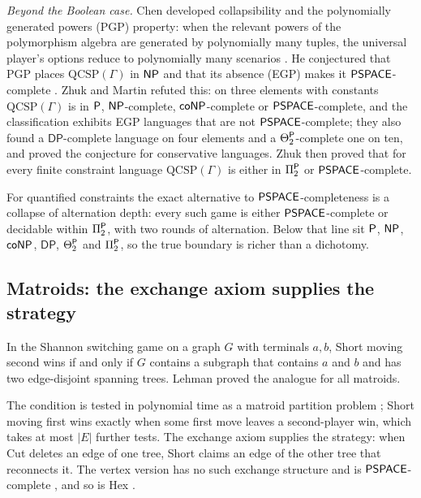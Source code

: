 \noindent\emph{Beyond the Boolean case.} Chen developed collapsibility and the polynomially generated powers (PGP) property: when the relevant powers of the polymorphism algebra are generated by polynomially many tuples, the universal player's options reduce to polynomially many scenarios \cite{Chen08,Chen11}. He conjectured that PGP places $\mathrm{QCSP}(\Gamma)$ in $\mathsf{NP}$ and that its absence (EGP) makes it $\mathsf{PSPACE}$-complete \cite{Chen12}. Zhuk and Martin \cite{ZhukMartin} refuted this: on three elements with constants $\mathrm{QCSP}(\Gamma)$ is in $\mathsf{P}$, $\mathsf{NP}$-complete, $\mathsf{coNP}$-complete or $\mathsf{PSPACE}$-complete, and the classification exhibits EGP languages that are not $\mathsf{PSPACE}$-complete; they also found a $\mathsf{DP}$-complete language on four elements and a $\Theta_2^{\mathsf{P}}$-complete one on ten, and proved the conjecture for conservative languages. Zhuk \cite{Zhuk24} then proved that for every finite constraint language $\mathrm{QCSP}(\Gamma)$ is either in $\Pi_2^{\mathsf{P}}$ or $\mathsf{PSPACE}$-complete.

\begin{remark*}
For quantified constraints the exact alternative to $\mathsf{PSPACE}$-completeness is a collapse of alternation depth: every such game is either $\mathsf{PSPACE}$-complete or decidable within $\Pi_2^{\mathsf{P}}$, with two rounds of alternation. Below that line sit $\mathsf{P}$, $\mathsf{NP}$, $\mathsf{coNP}$, $\mathsf{DP}$, $\Theta_2^{\mathsf{P}}$ and $\Pi_2^{\mathsf{P}}$, so the true boundary is richer than a dichotomy.
\end{remark*}

\subsection{Matroids: the exchange axiom supplies the strategy}\label{ssec:matroid}
\begin{theorem}\label{thm:lehman}
In the Shannon switching game on a graph $G$ with terminals $a,b$, Short moving second wins if and only if $G$ contains a subgraph that contains $a$ and $b$ and has two edge-disjoint spanning trees. Lehman proved the analogue for all matroids.
\end{theorem}
The condition is tested in polynomial time as a matroid partition problem \cite{EdmondsPartition}; Short moving first wins exactly when some first move leaves a second-player win, which takes at most $|E|$ further tests. The exchange axiom supplies the strategy: when Cut deletes an edge of one tree, Short claims an edge of the other tree that reconnects it. The vertex version has no such exchange structure and is $\mathsf{PSPACE}$-complete \cite{EvenTarjan}, and so is Hex \cite{Reisch}.

